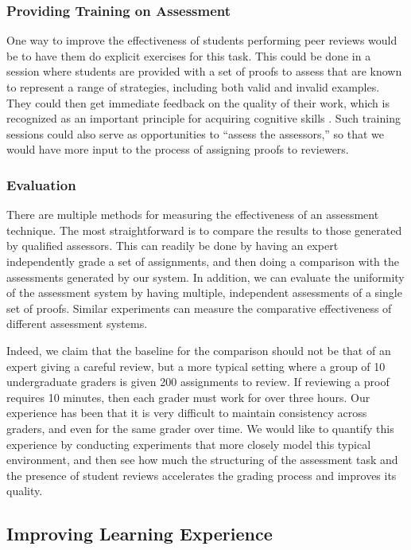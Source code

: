 \documentclass[12pt]{article}
\begin{document}
\subsubsection*{Providing Training on Assessment}

One way to improve the effectiveness of students performing peer
reviews would be to have them do explicit exercises for this task.
This could be done in a session where students are provided with a set
of proofs to assess that are known to represent a range of strategies,
including both valid and invalid examples.  They could then get
immediate feedback on the quality of their work, which is recognized
as an important principle for acquiring cognitive skills
\citep{anderson-jls95}.  Such training sessions could also serve as
opportunities to ``assess the assessors,'' so that we would have more
input to the process of assigning proofs to reviewers.


\subsubsection*{Evaluation}

There are multiple methods for measuring the effectiveness of an
assessment technique.  The most straightforward is to compare the
results to those generated by qualified assessors.  This can readily
be done by having an expert independently grade a set of
assignments, and then doing a comparison with the assessments
generated by our system.  In addition, we can evaluate the uniformity
of the assessment system by having multiple, independent assessments
of a single set of proofs.  Similar experiments can measure the
comparative effectiveness of different assessment systems.

Indeed, we claim that the baseline for the comparison
should not be that of an expert giving a careful review, but a more
typical setting where a group of 10 undergraduate graders is given 200
assignments to review.  If reviewing a proof requires 10 minutes, then
each grader must work for over three hours.  Our experience has been
that it is very difficult to maintain consistency across graders, and
even for the same grader over time.  We would like to quantify this
experience by conducting experiments that more closely model this
typical environment, and then see how much the structuring of the
assessment task and the presence of student
reviews accelerates the grading process and improves its quality.

\subsection{Improving Learning Experience}
\end{document}
